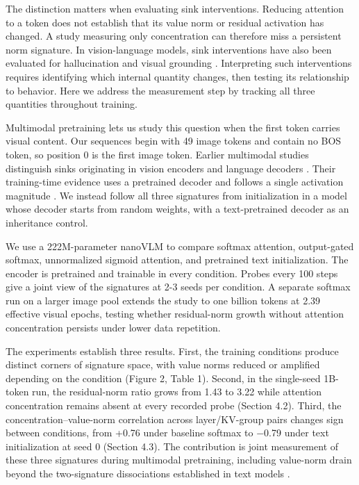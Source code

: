 \documentclass{article}
\begin{document}
The distinction matters when evaluating sink interventions. Reducing attention to a token does not establish that its value norm or residual activation has changed. A study measuring only concentration can therefore miss a persistent norm signature. In vision-language models, sink interventions have also been evaluated for hallucination and visual grounding \cite{ref12,ref13,ref14,ref15}. Interpreting such interventions requires identifying which internal quantity changes, then testing its relationship to behavior. Here we address the measurement step by tracking all three quantities throughout training.

Multimodal pretraining lets us study this question when the first token carries visual content. Our sequences begin with 49 image tokens and contain no BOS token, so position 0 is the first image token. Earlier multimodal studies distinguish sinks originating in vision encoders and language decoders \cite{ref11,ref12}. Their training-time evidence uses a pretrained decoder and follows a single activation magnitude \cite{ref11}. We instead follow all three signatures from initialization in a model whose decoder starts from random weights, with a text-pretrained decoder as an inheritance control.

We use a 222M-parameter nanoVLM \cite{ref17} to compare softmax attention, output-gated softmax, unnormalized sigmoid attention, and pretrained text initialization. The encoder is pretrained and trainable in every condition. Probes every 100 steps give a joint view of the signatures at 2-3 seeds per condition. A separate softmax run on a larger image pool extends the study to one billion tokens at 2.39 effective visual epochs, testing whether residual-norm growth without attention concentration persists under lower data repetition.

The experiments establish three results. First, the training conditions produce distinct corners of signature space, with value norms reduced or amplified depending on the condition (Figure 2, Table 1). Second, in the single-seed 1B-token run, the residual-norm ratio grows from 1.43 to 3.22 while attention concentration remains absent at every recorded probe (Section 4.2). Third, the concentration--value-norm correlation across layer/KV-group pairs changes sign between conditions, from +0.76 under baseline softmax to $-$0.79 under text initialization at seed 0 (Section 4.3). The contribution is joint measurement of these three signatures during multimodal pretraining, including value-norm drain beyond the two-signature dissociations established in text models \cite{ref9,ref10}.
\end{document}

